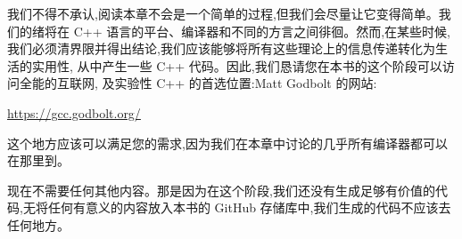 我们不得不承认,阅读本章不会是一个简单的过程,但我们会尽量让它变得简单。我们的绪将在 C++ 语言的平台、编译器和不同的方言之间徘徊。然而,在某些时候,我们必须清界限并得出结论,我们应该能够将所有这些理论上的信息传递转化为生活的实用性, 从中产生一些 C++ 代码。因此,我们恳请您在本书的这个阶段可以访问全能的互联网, 及实验性 C++ 的首选位置:Matt Godbolt 的网站: 

\url{https://gcc.godbolt.org/}

这个地方应该可以满足您的需求,因为我们在本章中讨论的几乎所有编译器都可以在那里到。

现在不需要任何其他内容。那是因为在这个阶段,我们还没有生成足够有价值的代码,无将任何有意义的内容放入本书的 GitHub 存储库中,我们生成的代码不应该去任何地方。